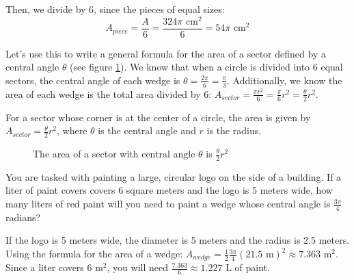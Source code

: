 Then, we divide by 6, since the pieces of equal sizes:
$$A_{piece} = \frac{A}{6} = \frac{324\pi\text{ cm}^2}{6} = 54\pi\text{ cm}^2$$

Let's use this to write a general formula for the area of a sector defined by a 
central angle $\theta$ (see figure \ref{fig:wedge}). We know that when a 
circle is divided into 6 equal sectors, the central angle of each wedge is 
$\theta = \frac{2\pi}{6} = \frac{\pi}{3}$. Additionally, we know the area of 
each wedge is the total area divided by 6: $A_{sector} = \frac{\pi r^2}{6} = 
\frac{\pi}{6} r^2 = \frac{\theta}{2} r^2$. 

\begin{mdframed}[style=important, frametitle={Area of a Wedge}]
For a sector whose corner is at the center of a circle, the area is given by 
$A_{sector} = \frac{\theta}{2} r^2$, where $\theta$ is the central angle and $r$ is the radius. 

\end{mdframed}

\begin{figure}[htbp]
\centering
{}
    \caption{The area of a sector with central angle $\theta$ is $\frac{\theta}{2}r^2$}
    \label{fig:wedge}
\end{figure}

\begin{Exercise}[title = {Area of a Wedge}, label = wedge]
You are tasked with painting a large, circular logo on the side of a building. 
If a liter of paint covers covers 6 square meters and the logo is 5 meters 
wide, how many liters of red paint will you need to paint a wedge whose central 
angle is $\frac{3\pi}{4}$ radians?
\end{Exercise}

\begin{Answer}[ref = wedge]
If the logo is 5 meters wide, the diameter is 5 meters and the radius is 2.5 
meters. Using the formula for the area of a wedge: $A_{wedge} = \frac{1}{2}
\frac{3\pi}{4}(21.5\text{ m})^2 \approx 7.363\text{ m}^2$. Since a liter covers 
$6\text{ m}^2$, you will need $\frac{7.363}{6} \approx 1.227\text{ L}$ of paint. 
\end{Answer}

